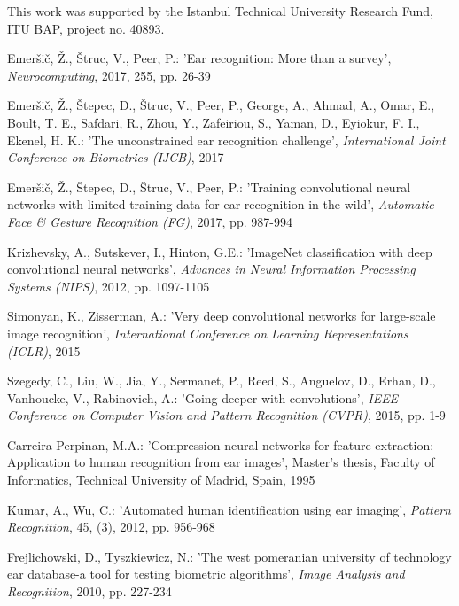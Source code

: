 \documentclass[11pt,journal,compsoc]{IEEEtran}
\begin{document}
This work was supported by the Istanbul Technical University Research Fund, ITU BAP, project no. 40893.

\begin{thebibliography}{1}

Emer{\v{s}}i{\v{c}}, {\v{Z}}., {\v{S}}truc, V., Peer, P.: 'Ear recognition: More than a survey', \textit{Neurocomputing}, 2017, 255, pp. 26-39

Emer{\v{s}}i{\v{c}}, {\v{Z}}., {\v{S}}tepec, D., {\v{S}}truc, V., Peer, P., George, A., Ahmad, A., Omar, E., Boult, T. E., Safdari, R., Zhou, Y., Zafeiriou, S., Yaman, D., Eyiokur, F. I., Ekenel, H. K.: 'The unconstrained ear recognition challenge', \textit{ International Joint Conference
on Biometrics (IJCB)}, 2017

Emer{\v{s}}i{\v{c}}, {\v{Z}}., {\v{S}}tepec, D., {\v{S}}truc, V., Peer, P.: 'Training convolutional neural networks with limited training data for ear recognition in the wild', \textit{Automatic Face \& Gesture Recognition (FG)}, 2017, pp. 987-994

Krizhevsky, A., Sutskever, I., Hinton, G.E.: 'ImageNet classification with deep convolutional neural networks', \textit{Advances in Neural Information Processing Systems (NIPS)}, 2012, pp. 1097-1105 

Simonyan, K., Zisserman, A.: 'Very deep convolutional networks for large-scale image recognition', \textit{International Conference on Learning Representations (ICLR)}, 2015

Szegedy, C., Liu, W., Jia, Y., Sermanet, P., Reed, S., Anguelov, D., Erhan, D., Vanhoucke, V., Rabinovich, A.: 'Going deeper with convolutions', \textit{IEEE Conference on Computer Vision and Pattern Recognition (CVPR)}, 2015, pp. 1-9

Carreira-Perpinan, M.A.: 'Compression neural networks for feature extraction: Application to human recognition from ear images', Master's thesis, Faculty of Informatics, Technical University of Madrid, Spain, 1995

Kumar, A., Wu, C.: 'Automated human identification using ear imaging', \textit{Pattern Recognition}, 45, (3), 2012, pp. 956-968

Frejlichowski, D., Tyszkiewicz, N.: 'The west pomeranian university of technology ear database-a tool for testing biometric algorithms', \textit{Image Analysis and Recognition}, 2010, pp. 227-234


\end{thebibliography}
\end{document}
